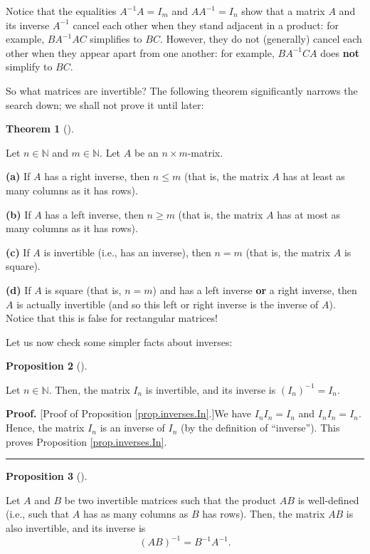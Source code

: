 \documentclass[numbers=enddot,12pt,final,onecolumn,notitlepage]{scrartcl}%
\theoremstyle{definition}
\newtheorem{theo}{Theorem}[section]
\newenvironment{theorem}[1][]
{\begin{theo}[#1]\begin{leftbar}}
{\end{leftbar}\end{theo}}
\newtheorem{prop}[theo]{Proposition}
\newenvironment{proposition}[1][]
{\begin{prop}[#1]\begin{leftbar}}
{\end{leftbar}\end{prop}}
\newenvironment{proof}[1][Proof]{\noindent\textbf{#1.} }{\ \rule{0.5em}{0.5em}}
\begin{document}
Notice that the equalities $A^{-1}A=I_{m}$ and $AA^{-1}=I_{n}$ show that a
matrix $A$ and its inverse $A^{-1}$ cancel each other when they stand adjacent
in a product: for example, $BA^{-1}AC$ simplifies to $BC$. However, they do
not (generally) cancel each other when they appear apart from one another: for
example, $BA^{-1}CA$ does \textbf{not} simplify to $BC$.

So what matrices are invertible? The following theorem significantly narrows
the search down; we shall not prove it until later:

\begin{theorem}
\label{thm.invertible.size}Let $n\in\mathbb{N}$ and $m\in\mathbb{N}$. Let $A$
be an $n\times m$-matrix.

\textbf{(a)} If $A$ has a right inverse, then $n\leq m$ (that is, the matrix
$A$ has at least as many columns as it has rows).

\textbf{(b)} If $A$ has a left inverse, then $n\geq m$ (that is, the matrix
$A$ has at most as many columns as it has rows).

\textbf{(c)} If $A$ is invertible (i.e., has an inverse), then $n=m$ (that is,
the matrix $A$ is square).

\textbf{(d)} If $A$ is square (that is, $n=m$) and has a left inverse
\textbf{or} a right inverse, then $A$ is actually invertible (and so this left
or right inverse is the inverse of $A$). Notice that this is false for
rectangular matrices!
\end{theorem}

Let us now check some simpler facts about inverses:

\begin{proposition}
\label{prop.inverses.In}Let $n\in\mathbb{N}$. Then, the matrix $I_{n}$ is
invertible, and its inverse is $\left(  I_{n}\right)  ^{-1}=I_{n}$.
\end{proposition}

\begin{proof}
[Proof of Proposition \ref{prop.inverses.In}.]We have $I_{n}I_{n}=I_{n}$ and
$I_{n}I_{n}=I_{n}$. Hence, the matrix $I_{n}$ is an inverse of $I_{n}$ (by the
definition of \textquotedblleft inverse\textquotedblright). This proves
Proposition \ref{prop.inverses.In}.
\end{proof}

\begin{proposition}
\label{prop.inverses.AB}Let $A$ and $B$ be two invertible matrices such that
the product $AB$ is well-defined (i.e., such that $A$ has as many columns as
$B$ has rows). Then, the matrix $AB$ is also invertible, and its inverse is
\begin{equation}
\left(  AB\right)  ^{-1}=B^{-1}A^{-1}. \label{eq.prop.inverses.AB.eq}%
\end{equation}

\end{proposition}
\end{document}
